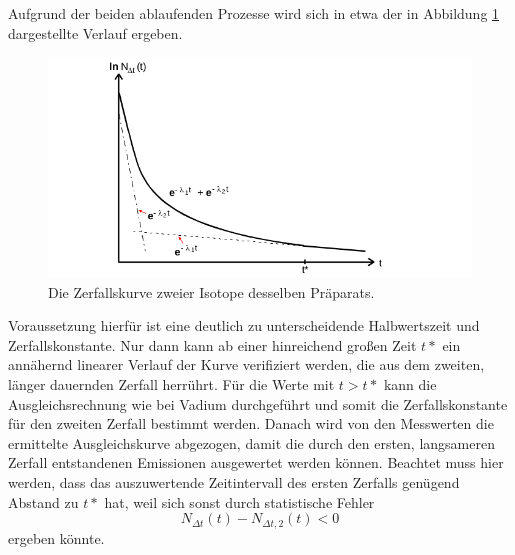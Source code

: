 Aufgrund der beiden ablaufenden Prozesse wird sich in etwa der in Abbildung \ref{fig:zweiZerfaelle} dargestellte Verlauf ergeben. 
\begin{figure}
    \centering
    \includegraphics[width=\textwidth]{plots/zweiZerfaelle.png}
    \caption{Die Zerfallskurve zweier Isotope desselben Präparats.}
    \label{fig:zweiZerfaelle}
\end{figure}
Voraussetzung hierfür ist eine deutlich zu unterscheidende Halbwertszeit und Zerfallskonstante. 
Nur dann kann ab einer hinreichend großen Zeit $t*$ ein annähernd linearer Verlauf der Kurve verifiziert werden, die 
aus dem zweiten, länger dauernden Zerfall herrührt. Für die Werte mit $t>t*$ kann die Ausgleichsrechnung wie bei Vadium 
durchgeführt und somit die Zerfallskonstante für den zweiten Zerfall bestimmt werden. 
Danach wird von den Messwerten die ermittelte Ausgleichskurve abgezogen, damit die durch den ersten, langsameren Zerfall 
entstandenen Emissionen ausgewertet werden können. 
Beachtet muss hier werden, dass das auszuwertende Zeitintervall des ersten Zerfalls genügend Abstand zu $t*$ hat, weil sich 
sonst durch statistische Fehler 
\begin{equation*}
    N_{\Delta t}(t)-N_{\Delta t,2}(t) <0
\end{equation*}
ergeben könnte.